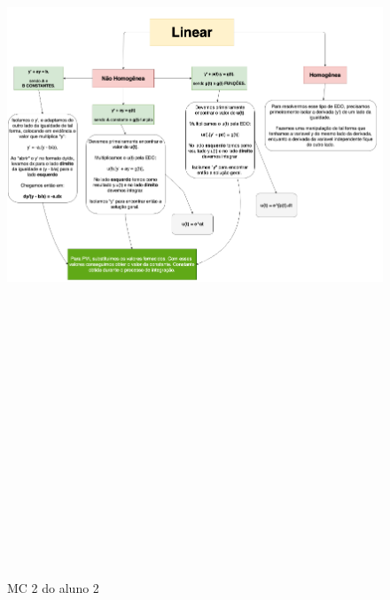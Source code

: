 \begin{landscape}
\begin{figure}[H]
\centering
\caption{MC 2 do aluno 2}
\includegraphics[width=200mm, height=250mm,keepaspectratio]{figuras/MC/mc2_2.png}
\label{mc2a2}
\end{figure}
\end{landscape}

